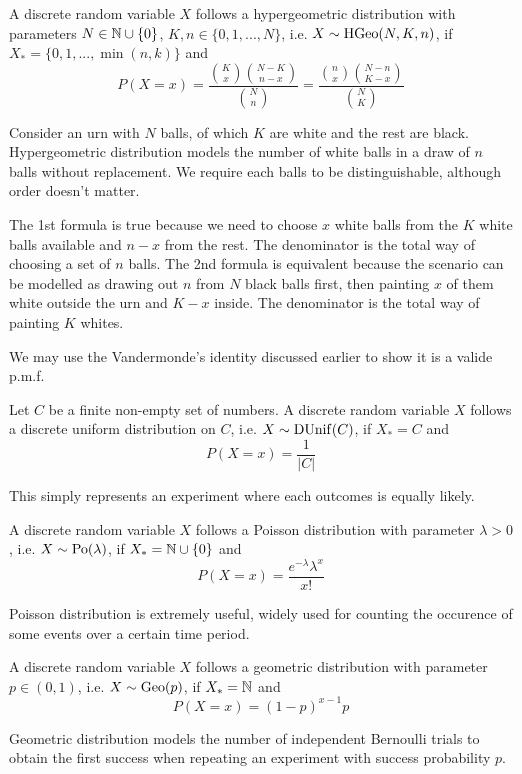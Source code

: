 \documentclass[11pt]{article}
\begin{document}
\begin{definition}
  A discrete random variable \(X\) follows a hypergeometric distribution with parameters \(N\in\N\cup\{0\}\), \(K,n\in\{0,1,...,N\}\), i.e. \(X\sim \rm{HGeo}(N,K,n)\), if \(X_*=\{0,1,...,\min(n,k)\}\) and 
  \[P(X=x)=\frac{\binom{K}{x}\binom{N-K}{n-x}}{\binom{N}{n}}=\frac{\binom{n}{x}\binom{N-n}{K-x}}{\binom{N}{K}}\]
\end{definition}
Consider an urn with \(N\) balls, of which \(K\) are white and the rest are black. Hypergeometric distribution models the number of white balls in a draw of \(n\) balls without replacement. We require each balls to be distinguishable, although order doesn't matter.

\vspace{5pt}The 1st formula is true because we need to choose \(x\) white balls from the \(K\) white balls available and \(n-x\) from the rest. The denominator is the total way of choosing a set of \(n\) balls. The 2nd formula is equivalent because the scenario can be modelled as drawing out \(n\) from \(N\) black balls first, then painting \(x\) of them white outside the urn and \(K-x\) inside. The denominator is the total way of painting \(K\) whites.

\vspace{5pt}We may use the Vandermonde's identity discussed earlier to show it is a valide p.m.f.
\begin{definition}
  Let \(C\) be a finite non-empty set of numbers. A discrete random variable \(X\) follows a discrete uniform distribution on \(C\), i.e. \(X\sim \rm{DUnif}(C)\), if \(X_*=C\) and
  \[P(X=x)=\frac{1}{|C|}\]
\end{definition}
This simply represents an experiment where each outcomes is equally likely.

\begin{definition}
  A discrete random variable \(X\) follows a Poisson distribution with parameter \(\lambda>0\), i.e. \(X\sim \rm{Po}(\lambda)\), if \(X_*=\N\cup\{0\}\) and
  \[P(X=x)=\frac{e^{-\lambda}\lambda^x}{x!}\]
\end{definition}
Poisson distribution is extremely useful, widely used for counting the occurence of some events over a certain time period.

\begin{definition}
  A discrete random variable \(X\) follows a geometric distribution with parameter \(p\in(0,1)\), i.e. \(X\sim \rm{Geo}(p)\), if \(X_*=\N\) and
  \[P(X=x)=(1-p)^{x-1}p\]
\end{definition}
Geometric distribution models the number of independent Bernoulli trials to obtain the first success when repeating an experiment with success probability \(p\).
\end{document}
